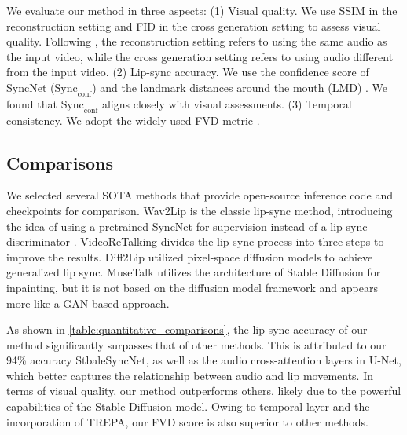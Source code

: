 We evaluate our method in three aspects: (1) Visual quality. We use SSIM \cite{wang2004image} in the reconstruction setting and FID \cite{heusel2017gans} in the cross generation setting to assess visual quality. Following \cite{mukhopadhyay2024diff2lip}, the reconstruction setting refers to using the same audio as the input video, while the cross generation setting refers to using audio different from the input video. (2) Lip-sync accuracy. We use the confidence score of SyncNet (${\text{Sync}}_{\text{conf}}$) \cite{chung2017out} and the landmark distances around the mouth (LMD) \cite{guan2023stylesync}. We found that ${\text{Sync}}_{\text{conf}}$ aligns closely with visual assessments. (3) Temporal consistency. We adopt the widely used FVD metric \cite{unterthiner2018towards}.

\subsection{Comparisons}
We selected several SOTA methods that provide open-source inference code and checkpoints for comparison. Wav2Lip \cite{prajwal2020lip} is the classic lip-sync method, introducing the idea of using a pretrained SyncNet for supervision instead of a lip-sync discriminator \cite{kr2019towards}. VideoReTalking \cite{cheng2022videoretalking} divides the lip-sync process into three steps to improve the results. Diff2Lip \cite{mukhopadhyay2024diff2lip} utilized pixel-space diffusion models to achieve generalized lip sync. MuseTalk \cite{zhang2024musetalk} utilizes the architecture of Stable Diffusion for inpainting, but it is not based on the diffusion model framework and appears more like a GAN-based approach.

As shown in \cref{table:quantitative_comparisons}, the lip-sync accuracy of our method significantly surpasses that of other methods. This is attributed to our 94\% accuracy StbaleSyncNet, as well as the audio cross-attention layers in U-Net, which better captures the relationship between audio and lip movements. In terms of visual quality, our method outperforms others, likely due to the powerful capabilities of the Stable Diffusion model. Owing to temporal layer \cite{guo2023animatediff} and the incorporation of TREPA, our FVD score is also superior to other methods.

